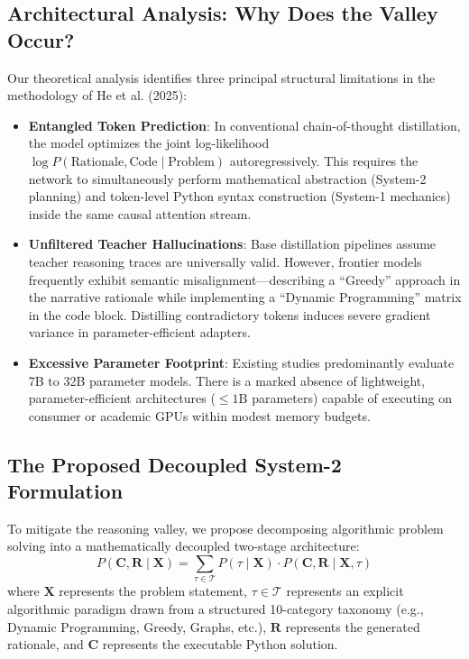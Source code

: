 \documentclass[lettersize,journal]{IEEEtran}
\begin{document}
\subsection{Architectural Analysis: Why Does the Valley Occur?}
Our theoretical analysis identifies three principal structural limitations in the methodology of He et al. (2025):
\begin{itemize}
    \item \textbf{Entangled Token Prediction}: In conventional chain-of-thought distillation, the model optimizes the joint log-likelihood $\log P(\text{Rationale}, \text{Code} \mid \text{Problem})$ autoregressively. This requires the network to simultaneously perform mathematical abstraction (System-2 planning) and token-level Python syntax construction (System-1 mechanics) inside the same causal attention stream.
    \item \textbf{Unfiltered Teacher Hallucinations}: Base distillation pipelines assume teacher reasoning traces are universally valid. However, frontier models frequently exhibit semantic misalignment---describing a ``Greedy'' approach in the narrative rationale while implementing a ``Dynamic Programming'' matrix in the code block. Distilling contradictory tokens induces severe gradient variance in parameter-efficient adapters.
    \item \textbf{Excessive Parameter Footprint}: Existing studies predominantly evaluate 7B to 32B parameter models. There is a marked absence of lightweight, parameter-efficient architectures ($\le 1\text{B}$ parameters) capable of executing on consumer or academic GPUs within modest memory budgets.
\end{itemize}

\subsection{The Proposed Decoupled System-2 Formulation}
To mitigate the reasoning valley, we propose decomposing algorithmic problem solving into a mathematically decoupled two-stage architecture:
\begin{equation}
\label{eq:decoupled}
P(\mathbf{C}, \mathbf{R} \mid \mathbf{X}) = \sum_{\tau \in \mathcal{T}} P(\tau \mid \mathbf{X}) \cdot P(\mathbf{C}, \mathbf{R} \mid \mathbf{X}, \tau)
\end{equation}
where $\mathbf{X}$ represents the problem statement, $\tau \in \mathcal{T}$ represents an explicit algorithmic paradigm drawn from a structured 10-category taxonomy (e.g., Dynamic Programming, Greedy, Graphs, etc.), $\mathbf{R}$ represents the generated rationale, and $\mathbf{C}$ represents the executable Python solution. 
\end{document}
